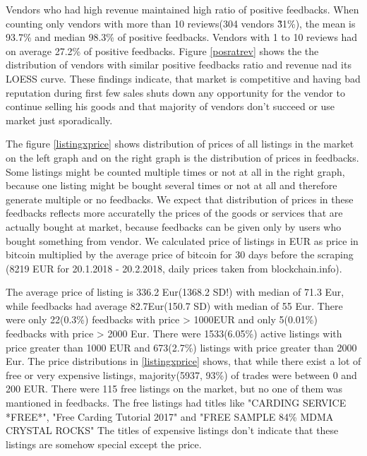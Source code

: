 \documentclass[
  digital, %
  table,   %
  lof,     %
  lot,     %
  oneside
]{fithesis3}
\begin{document}
Vendors who had high revenue maintained high ratio of positive feedbacks.
When counting only vendors with more than 10 reviews(304 vendors \~ 31\%),
the mean is 93.7\% and median 98.3\% of positive feedbacks.
Vendors with 1 to 10 reviews had on average 27.2\% of positive feedbacks.
Figure \ref{posratrev} shows the the distribution of vendors with similar
positive feedbacks ratio and revenue nad its LOESS curve.
These findings indicate, that market is competitive and
having bad reputation during first few sales shuts down any opportunity
for the vendor to continue selling his goods and that majority of vendors don't succeed or use
market just sporadically.

The figure \ref{listingxprice} shows distribution of prices of all listings in
 the market on the left graph and on the right graph is the distribution of prices
 in feedbacks. Some listings might be counted multiple times or not at all
 in the right graph, because one listing might be bought several times or not at all
 and therefore generate multiple or no feedbacks. We expect that distribution
 of prices in these feedbacks reflects more accuratelly the prices of the goods or services
 that are actually bought at market, because feedbacks can be given only by users who
 bought something from vendor. We calculated price of listings in EUR as 
 price in bitcoin multiplied by the average price of bitcoin for 30 days before the scraping
 (8219 EUR for 20.1.2018 - 20.2.2018, daily prices taken from blockchain.info).
 
 The average price of listing is 336.2 Eur(1368.2 SD!) with median of 71.3 Eur,
 while feedbacks had average 82.7Eur(150.7 SD) with median of 55 Eur.
  There were only 22(0.3\%) feedbacks with price > 1000EUR
 and only 5(0.01\%) feedbacks with price > 2000 Eur.
  There were 1533(6.05\%) active listings
 with price greater than 1000 EUR and
 673(2.7\%) listings with price greater than 2000 Eur.
 The price distributions in \ref{listingxprice} shows,
 that while there exist a lot of free or very expensive listings,
 majority(5937, 93\%) of trades were between 0 and 200 EUR.
 There were 115 free listings on the market,
 but no one of them was mantioned in feedbacks.
 The free listings had titles like "CARDING SERVICE *FREE*",
  "Free Carding Tutorial 2017" and "FREE SAMPLE 84\% MDMA CRYSTAL ROCKS"
 The titles of expensive listings don't indicate that 
these listings are somehow special except the price.
\end{document}
